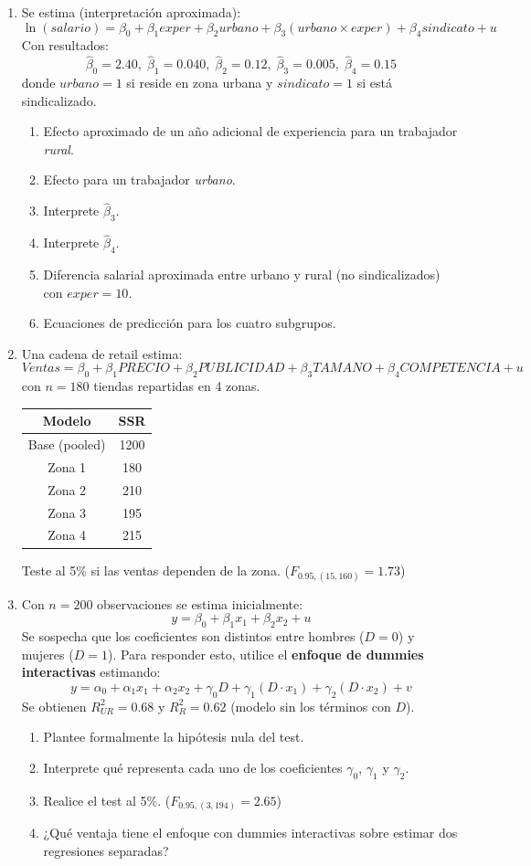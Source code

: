 \documentclass[11pt,a4paper]{article}
\begin{document}
\begin{enumerate}
\item Se estima (interpretación aproximada):
\[
\ln(salario) = \beta_0 + \beta_1 exper + \beta_2 urbano + \beta_3 (urbano \times exper) + \beta_4 sindicato + u
\]
Con resultados:
\[
\hat{\beta}_0 = 2.40, \; \hat{\beta}_1 = 0.040, \; \hat{\beta}_2 = 0.12, \; \hat{\beta}_3 = 0.005, \; \hat{\beta}_4 = 0.15
\]
donde $urbano=1$ si reside en zona urbana y $sindicato=1$ si está sindicalizado.
\begin{enumerate}
    \item[(a)] Efecto aproximado de un año adicional de experiencia para un trabajador \emph{rural}.
    \item[(b)] Efecto para un trabajador \emph{urbano}.
    \item[(c)] Interprete $\hat{\beta}_3$.
    \item[(d)] Interprete $\hat{\beta}_4$.
    \item[(e)] Diferencia salarial aproximada entre urbano y rural (no sindicalizados) con $exper=10$.
    \item[(f)] Ecuaciones de predicción para los cuatro subgrupos.
\end{enumerate}

\item Una cadena de retail estima:
\[
Ventas = \beta_0 + \beta_1 PRECIO + \beta_2 PUBLICIDAD + \beta_3 TAMANO + \beta_4 COMPETENCIA + u
\]
con $n=180$ tiendas repartidas en 4 zonas.
\begin{center}
\begin{tabular}{|c|c|}
\hline
Modelo & SSR \\
\hline
Base (pooled) & 1200 \\
Zona 1 & 180 \\
Zona 2 & 210 \\
Zona 3 & 195 \\
Zona 4 & 215 \\
\hline
\end{tabular}
\end{center}
Teste al 5\% si las ventas dependen de la zona. ($F_{0.95,(15,160)} = 1.73$)


\item Con $n=200$ observaciones se estima inicialmente:
\[
y = \beta_0 + \beta_1 x_1 + \beta_2 x_2 + u
\]
Se sospecha que los coeficientes son distintos entre hombres ($D=0$) y mujeres ($D=1$). Para responder esto, utilice el \textbf{enfoque de dummies interactivas} estimando:
\[
y = \alpha_0 + \alpha_1 x_1 + \alpha_2 x_2 + \gamma_0 D + \gamma_1 (D \cdot x_1) + \gamma_2 (D \cdot x_2) + v
\]
Se obtienen $R^2_{UR} = 0.68$ y $R^2_R = 0.62$ (modelo sin los términos con $D$).
\begin{enumerate}
    \item[(a)] Plantee formalmente la hipótesis nula del test.
    \item[(b)] Interprete qué representa cada uno de los coeficientes $\gamma_0$, $\gamma_1$ y $\gamma_2$.
    \item[(c)] Realice el test al 5\%. ($F_{0.95,(3,194)}=2.65$)
    \item[(d)] ¿Qué ventaja tiene el enfoque con dummies interactivas sobre estimar dos regresiones separadas?
\end{enumerate}


\end{enumerate}
\end{document}
